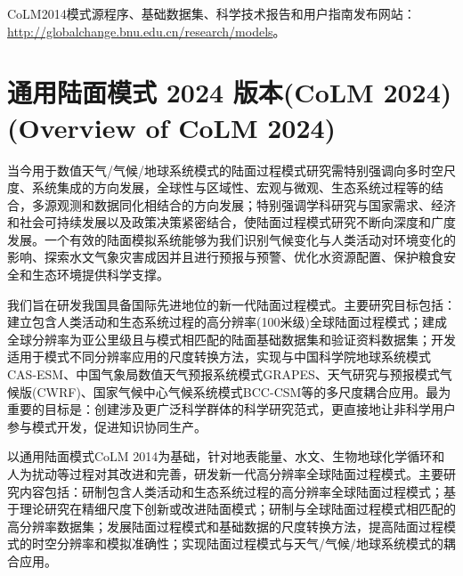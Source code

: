 CoLM2014模式源程序、基础数据集、科学技术报告和用户指南发布网站： \url{http://globalchange.bnu.edu.cn/research/models}。


\section[通用陆面模式 2024 版本({{CoLM}} 2024)]{通用陆面模式 2024 版本(CoLM 2024) (Overview of CoLM 2024)}
当今用于数值天气/气候/地球系统模式的陆面过程模式研究需特别强调向多时空尺度、系统集成的方向发展，全球性与区域性、宏观与微观、生态系统过程等的结合，多源观测和数据同化相结合的方向发展；特别强调学科研究与国家需求、经济和社会可持续发展以及政策决策紧密结合，使陆面过程模式研究不断向深度和广度发展。一个有效的陆面模拟系统能够为我们识别气候变化与人类活动对环境变化的影响、探索水文气象灾害成因并且进行预报与预警、优化水资源配置、保护粮食安全和生态环境提供科学支撑。

我们旨在研发我国具备国际先进地位的新一代陆面过程模式。主要研究目标包括：建立包含人类活动和生态系统过程的高分辨率(100米级)全球陆面过程模式；建成全球分辨率为亚公里级且与模式相匹配的陆面基础数据集和验证资料数据集；开发适用于模式不同分辨率应用的尺度转换方法，实现与中国科学院地球系统模式CAS-ESM、中国气象局数值天气预报系统模式GRAPES、天气研究与预报模式气候版(CWRF)、国家气候中心气候系统模式BCC-CSM等的多尺度耦合应用。最为重要的目标是：创建涉及更广泛科学群体的科学研究范式，更直接地让非科学用户参与模式开发，促进知识协同生产。

以通用陆面模式CoLM 2014为基础，针对地表能量、水文、生物地球化学循环和人为扰动等过程对其改进和完善，研发新一代高分辨率全球陆面过程模式。主要研究内容包括：研制包含人类活动和生态系统过程的高分辨率全球陆面过程模式；基于理论研究在精细尺度下创新或改进陆面模式；研制与全球陆面过程模式相匹配的高分辨率数据集；发展陆面过程模式和基础数据的尺度转换方法，提高陆面过程模式的时空分辨率和模拟准确性；实现陆面过程模式与天气/气候/地球系统模式的耦合应用。

